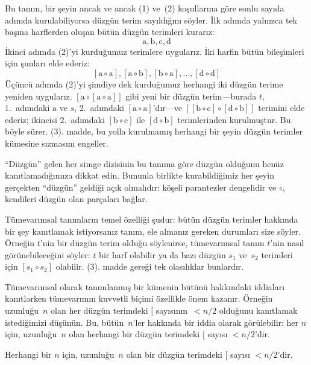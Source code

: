 Bu tanım, bir şeyin ancak ve ancak (1) ve~(2) koşullarına göre sonlu
sayıda adımda kurulabiliyorsa düzgün terim sayıldığını söyler. İlk
adımda yalnızca tek başına harflerden oluşan bütün düzgün terimleri
kurarız:
\[
\mathrm{a}, \mathrm{b}, \mathrm{c}, \mathrm{d}
\]
İkinci adımda (2)'yi kurduğumuz terimlere uygularız. İki harfin bütün
bileşimleri için şunları elde ederiz:
\[
[\mathrm{a} \circ \mathrm{a}], [\mathrm{a} \circ \mathrm{b}],
[\mathrm{b} \circ \mathrm{a}], \dots, [\mathrm{d} \circ \mathrm{d}]
\]
Üçüncü adımda (2)'yi şimdiye dek kurduğumuz herhangi iki düzgün terime
yeniden uygularız. $[\mathrm{a} \circ [\mathrm{a} \circ \mathrm{a}]]$
gibi yeni bir düzgün terim---burada $t$, 1.~adımdaki $\mathrm{a}$ ve
$s$, 2.~adımdaki $[\mathrm{a} \circ \mathrm{a}]$'dır---ve $[[\mathrm{b}
\circ \mathrm{c}] \circ [\mathrm{d} \circ \mathrm{b}]]$ terimini elde
ederiz; ikincisi 2.~adımdaki $[\mathrm{b} \circ \mathrm{c}]$ ile
$[\mathrm{d} \circ \mathrm{b}]$ terimlerinden kurulmuştur.
Bu böyle sürer. (3). madde, bu yolla kurulmamış herhangi bir şeyin
düzgün terimler kümesine sızmasını engeller.

``Düzgün'' gelen her simge dizisinin bu tanıma göre düzgün olduğunu
henüz kanıtlamadığımıza dikkat edin. Bununla birlikte kurabildiğimiz
her şeyin gerçekten ``düzgün'' geldiği açık olmalıdır: köşeli
parantezler dengelidir ve $\circ$, kendileri düzgün olan parçaları
bağlar.

Tümevarımsal tanımların temel özelliği şudur: bütün düzgün terimler
hakkında bir şey kanıtlamak istiyorsanız tanım, ele almanız gereken
durumları size söyler. Örneğin $t$'nin bir düzgün terim olduğu
söylenirse, tümevarımsal tanım $t$'nin nasıl görünebileceğini söyler:
$t$ bir harf olabilir ya da bazı düzgün $s_1$ ve~$s_2$ terimleri için
$[s_1 \circ s_2]$ olabilir. (3). madde gereği tek olasılıklar bunlardır.

Tümevarımsal olarak tanımlanmış bir kümenin bütünü hakkındaki iddiaları
kanıtlarken tümevarımın kuvvetli biçimi özellikle önem kazanır. Örneğin
uzunluğu~$n$ olan her düzgün terimdeki $[$ sayısının~$< n/2$ olduğunu
kanıtlamak istediğimizi düşünün. Bu, bütün~$n$'ler hakkında bir iddia
olarak görülebilir: her $n$ için, uzunluğu~$n$ olan herhangi bir düzgün
terimdeki $[$ sayısı $< n/2$'dir.

\begin{prop}
  Herhangi bir $n$ için, uzunluğu~$n$ olan bir düzgün terimdeki $[$
  sayısı $< n/2$'dir.
\end{prop}

